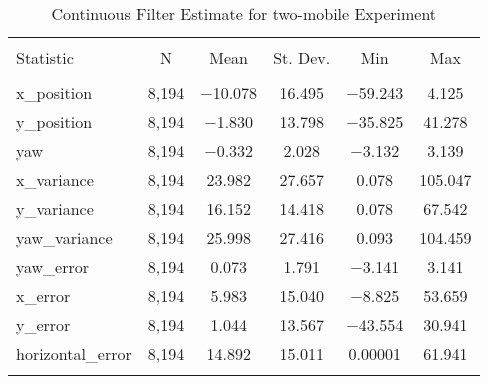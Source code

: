 
\begin{table}[h] \centering 
  \caption{Continuous Filter Estimate for two-mobile Experiment} 
  \label{tab:two_mobile_continuous_summary} 
\begin{tabular}{@{\extracolsep{5pt}}lccccc} 
\\[-1.8ex]\hline 
\hline \\[-1.8ex] 
Statistic & \multicolumn{1}{c}{N} & \multicolumn{1}{c}{Mean} & \multicolumn{1}{c}{St. Dev.} & \multicolumn{1}{c}{Min} & \multicolumn{1}{c}{Max} \\ 
\hline \\[-1.8ex] 
x\_position & 8,194 & $-$10.078 & 16.495 & $-$59.243 & 4.125 \\ 
y\_position & 8,194 & $-$1.830 & 13.798 & $-$35.825 & 41.278 \\ 
yaw & 8,194 & $-$0.332 & 2.028 & $-$3.132 & 3.139 \\ 
x\_variance & 8,194 & 23.982 & 27.657 & 0.078 & 105.047 \\ 
y\_variance & 8,194 & 16.152 & 14.418 & 0.078 & 67.542 \\ 
yaw\_variance & 8,194 & 25.998 & 27.416 & 0.093 & 104.459 \\ 
yaw\_error & 8,194 & 0.073 & 1.791 & $-$3.141 & 3.141 \\ 
x\_error & 8,194 & 5.983 & 15.040 & $-$8.825 & 53.659 \\ 
y\_error & 8,194 & 1.044 & 13.567 & $-$43.554 & 30.941 \\ 
horizontal\_error & 8,194 & 14.892 & 15.011 & 0.00001 & 61.941 \\ 
\hline \\[-1.8ex] 
\end{tabular} 
\end{table} 
